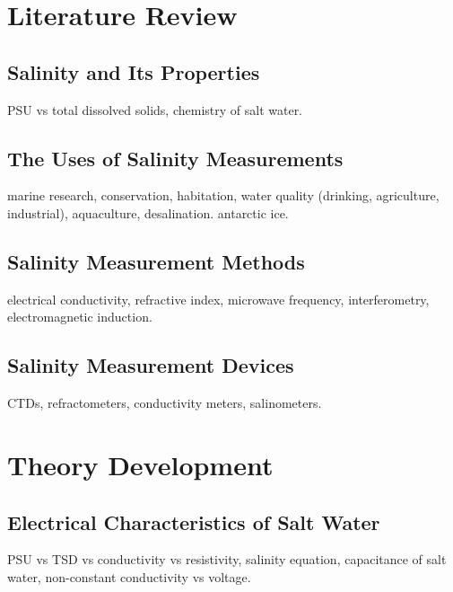 
\chapter{Literature Review} \label{ch:literature}

\section{Salinity and Its Properties} \label{sec:salinity-and-its-properties}
PSU vs total dissolved solids, chemistry of salt water.

\section{The Uses of Salinity Measurements} \label{sec:the-uses-of-salinity-measurements}
marine research, conservation, habitation, water quality (drinking, agriculture, industrial), aquaculture, desalination.
antarctic ice.

\section{Salinity Measurement Methods} \label{sec:salinity-measurement-techniques}
electrical conductivity, refractive index, microwave frequency, interferometry, electromagnetic induction.

\section{Salinity Measurement Devices} \label{sec:salinity-measurement-devices}
CTDs, refractometers, conductivity meters, salinometers.


\chapter{Theory Development} \label{ch:theory-development}

\section{Electrical Characteristics of Salt Water} \label{sec:electrical-characteristics-of-salt-water}
PSU vs TSD vs conductivity vs resistivity, salinity equation, capacitance of salt water, non-constant conductivity vs voltage.

